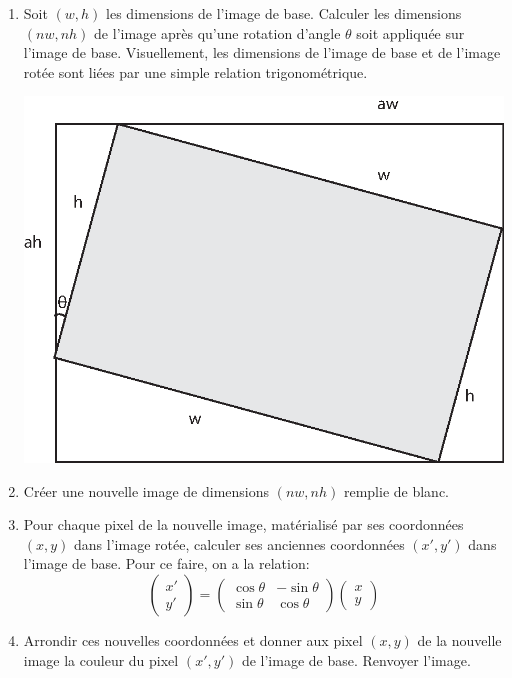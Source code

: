 \begin{enumerate}

  \item Soit $(w, h)$ les dimensions de l'image de base. Calculer les dimensions
    $(nw, nh)$ de l'image après qu'une rotation d'angle $\theta$ soit appliquée
    sur l'image de base. Visuellement, les dimensions de l'image de base et de
    l'image rotée sont liées par une simple relation trigonométrique.
  \begin{center}
    \includegraphics[scale=0.75]{chapters/Pictures/toogy/rotation-new-size.eps}
  \end{center}

  \item Créer une nouvelle image de dimensions $(nw, nh)$ remplie de blanc.

  \item Pour chaque pixel de la nouvelle image, matérialisé par ses coordonnées
    $(x,y)$ dans l'image rotée, calculer ses anciennes coordonnées $(x',y')$
    dans l'image de base. Pour ce faire, on a la relation: \\ 
    $$\begin{pmatrix}x'\\y'\end{pmatrix} =
      \begin{pmatrix}
        \cos\theta & -\sin\theta \\
        \sin\theta & \cos\theta
      \end{pmatrix}
    \begin{pmatrix}
      x \\
      y
    \end{pmatrix}$$

  \item Arrondir ces nouvelles coordonnées et donner aux pixel $(x,y)$ de la
    nouvelle image la couleur du pixel $(x',y')$ de l'image de base. Renvoyer
    l'image.

\end{enumerate}

